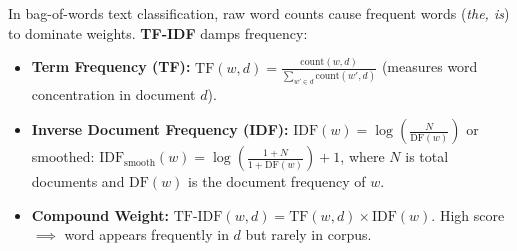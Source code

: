 \documentclass[10pt,a4paper]{article}
\begin{document}
\par\vspace{1pt}
In bag-of-words text classification, raw word counts cause frequent words (\textit{the, is}) to dominate weights. \textbf{TF-IDF} damps frequency:
\begin{itemize}[leftmargin=12pt, itemsep=0.5pt, parsep=0pt, topsep=0.5pt]
    \item \textbf{Term Frequency (TF):} $\text{TF}(w, d) = \frac{\text{count}(w, d)}{\sum_{w' \in d} \text{count}(w', d)}$ (measures word concentration in document $d$).
    \item \textbf{Inverse Document Frequency (IDF):} $\text{IDF}(w) = \log\left(\frac{N}{\text{DF}(w)}\right)$ or smoothed: $\text{IDF}_{\text{smooth}}(w) = \log\left(\frac{1+N}{1+\text{DF}(w)}\right) + 1$, where $N$ is total documents and $\text{DF}(w)$ is the document frequency of $w$.
    \item \textbf{Compound Weight:} $\text{TF-IDF}(w, d) = \text{TF}(w, d) \times \text{IDF}(w)$. High score $\implies$ word appears frequently in $d$ but rarely in corpus.
\end{itemize}

\newpage

\end{document}
